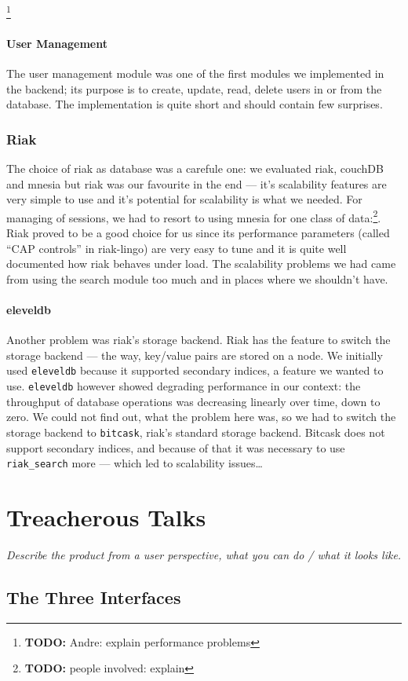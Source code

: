 \documentclass[11pt,a4paper]{report}
\newcommand{\hi}[1]{{\color{red}\em #1\/}\\}
\newcommand{\todo}[1]{\footnote{{\color{red} {\bf TODO:} #1}}}
\begin{document}
\todo{Andre: explain performance problems}
\subsubsection{User Management}
The user management module was one of the first modules we implemented in the
backend; its purpose is to create, update, read, delete users in or from the
database. The implementation is quite short and should contain few surprises.

\subsection{Riak}
The choice of riak as database was a carefule one: we evaluated riak, couchDB
and mnesia but riak was our favourite in the end --- it's scalability features
are very simple to use and it's potential for scalability is what we needed.
For managing of sessions, we had to resort to using mnesia for one class of
data:\todo{people involved: explain}. \\
Riak proved to be a good choice for us since its performance parameters (called
``CAP controls'' in riak-lingo) are very easy to tune and it is quite well
documented how riak behaves under load. The scalability problems we had
came from using the search module too much and in places where we shouldn't
have.
\subsubsection{eleveldb}
Another problem was riak's storage backend. Riak has the feature to switch the
storage backend --- the way, key/value pairs are stored on a node.
We initially used {\tt eleveldb} because it supported secondary indices, a
feature we wanted to use. {\tt eleveldb} however showed degrading performance
in our context: the throughput of database operations was decreasing linearly
over time, down to zero. We could not find out, what the problem here was, so
we had to switch the storage backend to {\tt bitcask}, riak's standard storage
backend. Bitcask does not support secondary indices, and because of that it was
necessary to use {\tt riak\_search} more --- which led to scalability
issues\ldots

\chapter{Treacherous Talks}
\hi{Describe the product from a user perspective, what you can do / what it looks like.}
\section{The Three Interfaces}
\end{document}
